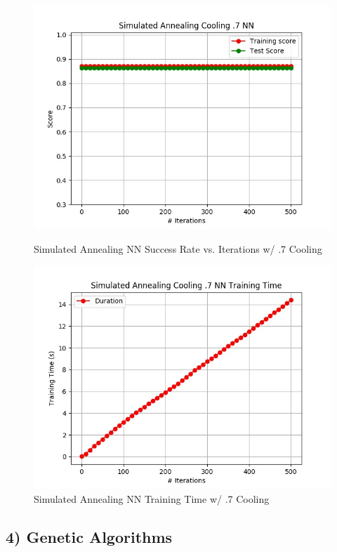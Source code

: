 \documentclass[h]{article}
\begin{document}
 \begin{figure}[H]
      \includegraphics[width=1\textwidth,keepaspectratio]{simulated_annealing_cooling_pt7_nn.jpg} 
      \caption*{Simulated Annealing NN Success Rate vs. Iterations w/ .7 Cooling} 
   \endminipage\hfill
      \includegraphics[width=1\textwidth,keepaspectratio]{simulated_annealing_cooling_pt7_nn_time.jpg} 
      \caption*{Simulated Annealing NN Training Time w/ .7 Cooling} 
   \endminipage\hfill
\end{figure}

\subsection*{4) Genetic Algorithms}  
\end{document}
